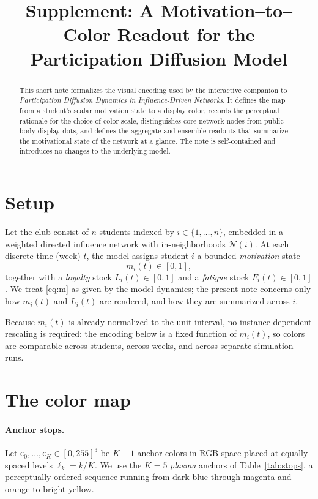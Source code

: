\documentclass[11pt]{article}
\title{\textbf{Supplement: A Motivation--to--Color Readout for the\\
Participation Diffusion Model}}
\author{}
\date{}
\newcommand{\Nn}{\mathcal{N}}
\begin{document}
\maketitle
\vspace{-3em}

\begin{abstract}
\noindent
This short note formalizes the visual encoding used by the interactive companion to
\emph{Participation Diffusion Dynamics in Influence-Driven Networks}. It defines the map from a
student's scalar motivation state to a display color, records the perceptual rationale for the
choice of color scale, distinguishes core-network nodes from public-body display dots, and defines
the aggregate and ensemble readouts that summarize the motivational state of the network at a
glance. The note is self-contained and introduces no changes to the underlying model.
\end{abstract}

\section{Setup}

Let the club consist of $n$ students indexed by $i \in \{1,\dots,n\}$, embedded in a weighted
directed influence network with in-neighborhoods $\Nn(i)$. At each discrete time (week) $t$, the
model assigns student $i$ a bounded \emph{motivation} state
\begin{equation}
  m_i(t) \in [0,1],
  \label{eq:m}
\end{equation}
together with a \emph{loyalty} stock $L_i(t)\in[0,1]$ and a \emph{fatigue} stock $F_i(t)\in[0,1]$.
We treat \eqref{eq:m} as given by the model dynamics; the present note concerns only how
$m_i(t)$ and $L_i(t)$ are rendered, and how they are summarized across $i$.

Because $m_i(t)$ is already normalized to the unit interval, no instance-dependent rescaling is
required: the encoding below is a fixed function of $m_i(t)$, so colors are comparable across
students, across weeks, and across separate simulation runs.

\section{The color map}

\paragraph{Anchor stops.}
Let $\mathsf{c}_0,\dots,\mathsf{c}_K \in [0,255]^3$ be $K{+}1$ anchor colors in RGB space placed at
equally spaced levels $\ell_k = k/K$. We use the $K{=}5$ \emph{plasma} anchors of
Table~\ref{tab:stops}, a perceptually ordered sequence running from dark blue through magenta and
orange to bright yellow.
\end{document}
